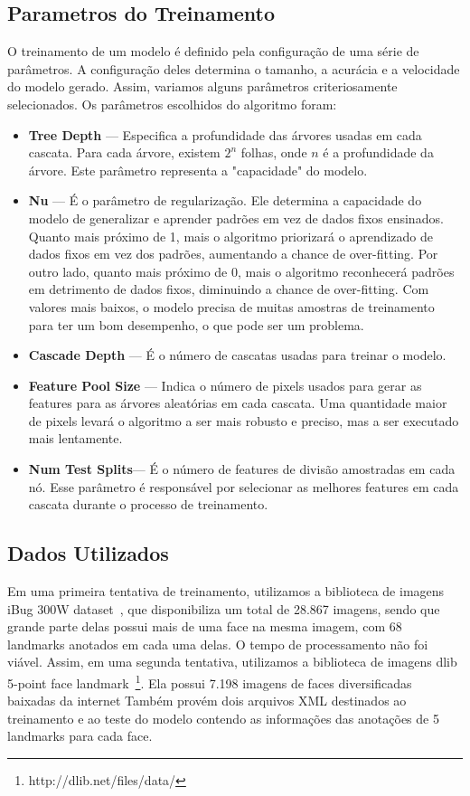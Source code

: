 \documentclass[twoside,conference,a4paper]{IEEEtran}
\begin{document}
\subsection{Parametros do Treinamento}
O treinamento de um modelo é definido pela configuração de uma série de parâmetros. A configuração deles determina o tamanho, a acurácia e a velocidade do modelo gerado. Assim, variamos alguns parâmetros criteriosamente selecionados.
Os parâmetros escolhidos do algoritmo foram:
\begin{itemize}
    \item \textbf{Tree Depth} --- Especifica a profundidade das árvores usadas em cada cascata. Para cada árvore, existem $2^n$ folhas, onde $n$ é a profundidade da árvore. Este parâmetro representa a "capacidade" do modelo. 

\item \textbf{Nu} --- É o parâmetro de regularização. Ele determina a capacidade do modelo de generalizar e aprender padrões em vez de dados fixos ensinados. Quanto mais próximo de 1, mais o algoritmo priorizará o aprendizado de dados fixos em vez dos padrões, aumentando a chance de over-fitting. Por outro lado, quanto mais próximo de 0, mais o algoritmo reconhecerá padrões em detrimento de dados fixos, diminuindo a chance de  over-fitting. 
Com valores mais baixos, o modelo precisa de muitas amostras de treinamento para ter um bom desempenho, o que pode ser um problema.

\item \textbf{Cascade Depth} --- É o número de cascatas usadas para treinar o modelo. 

\item \textbf{Feature Pool Size} --- Indica o número de pixels usados para gerar as features para as árvores aleatórias em cada cascata. Uma quantidade maior de pixels levará o algoritmo a ser mais robusto e preciso, mas a ser executado mais lentamente.

\item \textbf{Num Test Splits}--- É o número de features de divisão amostradas em cada nó. Esse parâmetro é responsável por selecionar as melhores features em cada cascata durante o processo de treinamento.
\end{itemize}

\subsection{Dados Utilizados}
Em uma primeira tentativa de treinamento, utilizamos a biblioteca de imagens iBug 300W dataset~\cite{300w}, que disponibiliza um total de 28.867 imagens, sendo que grande parte delas possui mais de uma face na mesma imagem, com 68 landmarks anotados em cada uma delas. O tempo de processamento não foi viável.
Assim, em uma segunda tentativa, utilizamos a biblioteca de imagens dlib 5-point face landmark~\footnote{http://dlib.net/files/data/}. Ela possui 7.198 imagens de faces diversificadas baixadas da internet Também provém dois arquivos XML destinados ao treinamento e ao teste do modelo contendo as informações das anotações de 5 landmarks para cada face.
\end{document}
